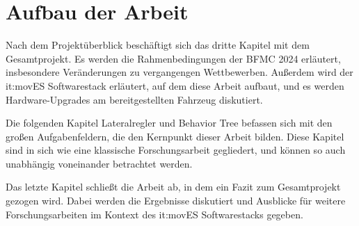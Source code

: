\newpage

\section{Aufbau der Arbeit}


Nach dem Projektüberblick beschäftigt sich das dritte Kapitel mit dem Gesamtprojekt.
Es werden die Rahmenbedingungen der \gls{BFMC} 2024 erläutert, insbesondere Veränderungen zu vergangengen Wettbewerben. 
Außerdem wird der it:movES Softwarestack erläutert, auf dem diese Arbeit aufbaut, und es werden Hardware-Upgrades am bereitgestellten Fahrzeug diskutiert.

Die folgenden Kapitel Lateralregler und Behavior Tree befassen sich mit den großen Aufgabenfeldern, die den Kernpunkt dieser Arbeit bilden. 
Diese Kapitel sind in sich wie eine klassische Forschungsarbeit gegliedert, und können so auch unabhängig voneinander betrachtet werden.

Das letzte Kapitel schließt die Arbeit ab, in dem ein Fazit zum Gesamtprojekt gezogen wird.
Dabei werden die Ergebnisse diskutiert und Ausblicke für weitere Forschungsarbeiten im Kontext des it:movES Softwarestacks gegeben.